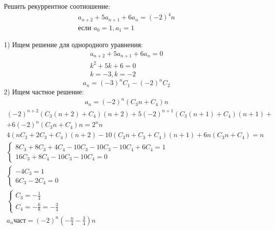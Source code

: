 \begin{task}
    Решить рекуррентное соотношение:
    \begin{gather*}
        a_{n+2}+5a_{n+1}+6a_n=(-2)^4n \\
        \text{если } a_0 = 1, a_1 = 1
    \end{gather*}

    \begin{solution}
        1) Ищем решение для однородного уравнения:
        \begin{gather*}
            a_{n+2}+5a_{n+1}+6a_n=0 \\
            k^2 + 5k + 6 = 0 \\
            k = -3, k = -2
        \end{gather*}
        \begin{equation*}
            a_n = (-3)^n C_1 - (-2)^n C_2
        \end{equation*}
        2) Ищем частное решение:
        \begin{gather*}
            a_n = (-2)^n (C_3n+C_4)n
        \end{gather*}
        \begin{multline*}
            (-2)^{n+2}(C_3(n+2)+C_4)(n+2)+5(-2)^{n+1}(C_3(n+1)+C_4)(n+1)+ \\
            + 6(-2)^n(C_3n+C_4)n = 2^nn
        \end{multline*}
        \begin{gather*}
            4(nC_3+2C_3+C_4)(n+2)-10(C_3n+C_3+C_4)(n+1)+6n(C_3n+C_4)=n \\
            \begin{cases}
                8C_3+8C_3+4C_4-10C_3-10C_3-10C_4+6C_4=1 \\
                16C_3+8C_4-10C_3-10C_4=0
            \end{cases} \\
            \begin{cases}
                -4C_3=1     \\
                6C_3-2C_4=0
            \end{cases} \\
            \begin{cases}
                C_3=-\frac{1}{4} \\
                C_4=-\frac{6}{8} = -\frac{3}{4}
            \end{cases} \\
            a_n\text{част}=(-2)^n(-\frac{n}{4}-\frac{3}{4})n
        \end{gather*}

\end{solution}
\end{task}
